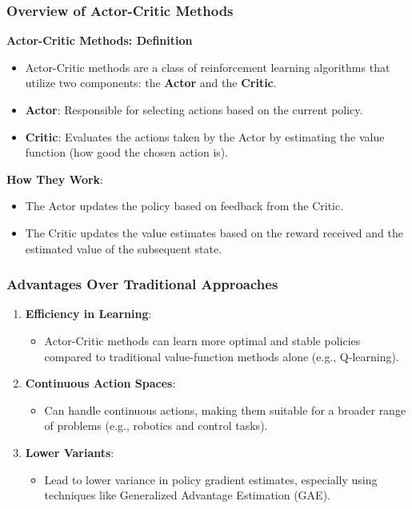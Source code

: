 \documentclass[aspectratio=169]{beamer}
\begin{document}
\begin{frame}[fragile]
    \frametitle{Overview of Actor-Critic Methods}
    \textbf{Actor-Critic Methods: Definition}
    \begin{itemize}
        \item Actor-Critic methods are a class of reinforcement learning algorithms that utilize two components: the \textbf{Actor} and the \textbf{Critic}.
        \item \textbf{Actor}: Responsible for selecting actions based on the current policy.
        \item \textbf{Critic}: Evaluates the actions taken by the Actor by estimating the value function (how good the chosen action is).
    \end{itemize}

    \textbf{How They Work}:
    \begin{itemize}
        \item The Actor updates the policy based on feedback from the Critic.
        \item The Critic updates the value estimates based on the reward received and the estimated value of the subsequent state.
    \end{itemize}
\end{frame}

\begin{frame}[fragile]
    \frametitle{Advantages Over Traditional Approaches}
    \begin{enumerate}
        \item \textbf{Efficiency in Learning}:
        \begin{itemize}
            \item Actor-Critic methods can learn more optimal and stable policies compared to traditional value-function methods alone (e.g., Q-learning).
        \end{itemize}
        
        \item \textbf{Continuous Action Spaces}:
        \begin{itemize}
            \item Can handle continuous actions, making them suitable for a broader range of problems (e.g., robotics and control tasks).
        \end{itemize}
        
        \item \textbf{Lower Variants}:
        \begin{itemize}
            \item Lead to lower variance in policy gradient estimates, especially using techniques like Generalized Advantage Estimation (GAE).
        \end{itemize}
    \end{enumerate}
\end{frame}
\end{document}
